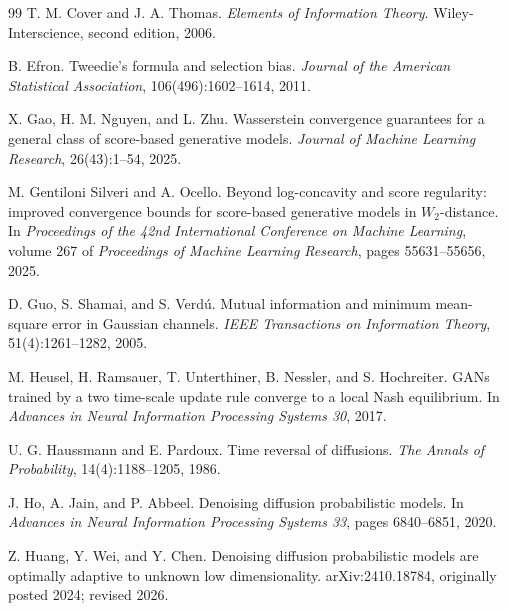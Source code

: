 \documentclass[11pt]{article}
\theoremstyle{breakstyle}
\begin{document}
\begin{thebibliography}{99}
T. M. Cover and J. A. Thomas.
\newblock \emph{Elements of Information Theory}.
\newblock Wiley-Interscience, second edition, 2006.

B. Efron.
\newblock Tweedie's formula and selection bias.
\newblock \emph{Journal of the American Statistical Association}, 106(496):1602--1614, 2011.

X. Gao, H. M. Nguyen, and L. Zhu.
\newblock Wasserstein convergence guarantees for a general class of score-based generative models.
\newblock \emph{Journal of Machine Learning Research}, 26(43):1--54, 2025.

M. Gentiloni Silveri and A. Ocello.
\newblock Beyond log-concavity and score regularity: improved convergence bounds for score-based generative models in $W_2$-distance.
\newblock In \emph{Proceedings of the 42nd International Conference on Machine Learning}, volume 267 of \emph{Proceedings of Machine Learning Research}, pages 55631--55656, 2025.

D. Guo, S. Shamai, and S. Verd\'u.
\newblock Mutual information and minimum mean-square error in Gaussian channels.
\newblock \emph{IEEE Transactions on Information Theory}, 51(4):1261--1282, 2005.

M. Heusel, H. Ramsauer, T. Unterthiner, B. Nessler, and S. Hochreiter.
\newblock GANs trained by a two time-scale update rule converge to a local Nash equilibrium.
\newblock In \emph{Advances in Neural Information Processing Systems 30}, 2017.

U. G. Haussmann and E. Pardoux.
\newblock Time reversal of diffusions.
\newblock \emph{The Annals of Probability}, 14(4):1188--1205, 1986.

J. Ho, A. Jain, and P. Abbeel.
\newblock Denoising diffusion probabilistic models.
\newblock In \emph{Advances in Neural Information Processing Systems 33}, pages 6840--6851, 2020.

Z. Huang, Y. Wei, and Y. Chen.
\newblock Denoising diffusion probabilistic models are optimally adaptive to unknown low dimensionality.
\newblock arXiv:2410.18784, originally posted 2024; revised 2026.


\end{thebibliography}
\end{document}
